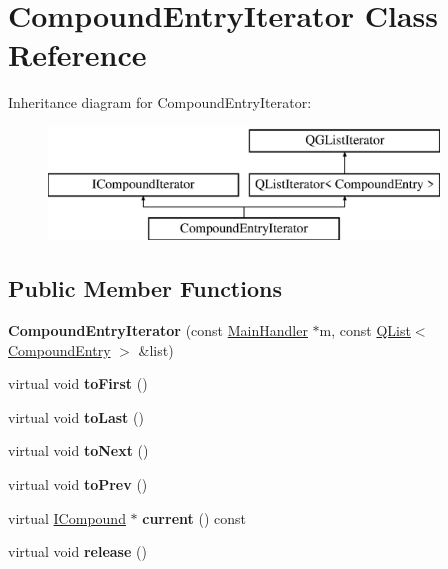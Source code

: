 \hypertarget{class_compound_entry_iterator}{}\section{Compound\+Entry\+Iterator Class Reference}
\label{class_compound_entry_iterator}
Inheritance diagram for Compound\+Entry\+Iterator\+:\begin{figure}[H]
\begin{center}
\leavevmode
\includegraphics[height=3.000000cm]{class_compound_entry_iterator}
\end{center}
\end{figure}
\subsection*{Public Member Functions}
\begin{DoxyCompactItemize}
\item 
\mbox{\label{class_compound_entry_iterator_a673615130f4d334cfde941c95c8fa385}} 
{\bfseries Compound\+Entry\+Iterator} (const \mbox{\hyperlink{class_main_handler}{Main\+Handler}} $\ast$m, const \mbox{\hyperlink{class_q_list}{Q\+List}}$<$ \mbox{\hyperlink{struct_compound_entry}{Compound\+Entry}} $>$ \&list)
\item 
\mbox{\label{class_compound_entry_iterator_ac0c931ca6b03d0a480a7afc2fe5df098}} 
virtual void {\bfseries to\+First} ()
\item 
\mbox{\label{class_compound_entry_iterator_a3470608126a8d522d6d4e6ab6d8366ce}} 
virtual void {\bfseries to\+Last} ()
\item 
\mbox{\label{class_compound_entry_iterator_a09b3421fa6919dc0bc734203e443275e}} 
virtual void {\bfseries to\+Next} ()
\item 
\mbox{\label{class_compound_entry_iterator_a66161e55a8f8ec34bf26fdffbdbb75f0}} 
virtual void {\bfseries to\+Prev} ()
\item 
\mbox{\label{class_compound_entry_iterator_aed5d60d2ad7a764259c6d38892ec6af1}} 
virtual \mbox{\hyperlink{class_i_compound}{I\+Compound}} $\ast$ {\bfseries current} () const
\item 
\mbox{\label{class_compound_entry_iterator_a0eb539c56c7226863cf5529f4b6e18e8}} 
virtual void {\bfseries release} ()
\end{DoxyCompactItemize}
